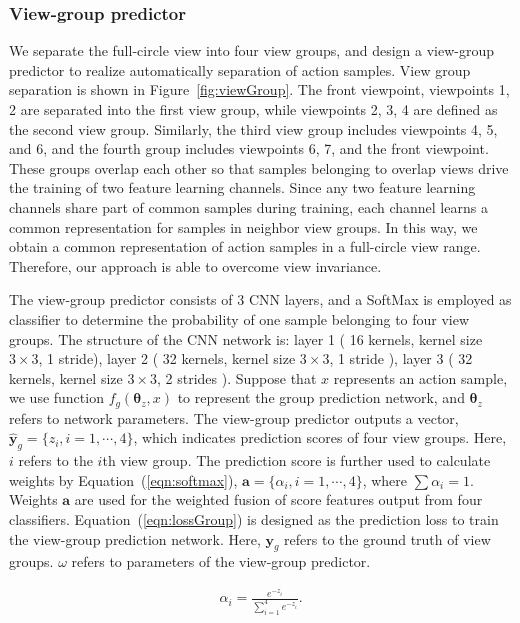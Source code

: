 \documentclass[journal]{IEEEtran}
\begin{document}
\subsubsection{View-group predictor}
We separate the full-circle view into four view groups, and design a view-group predictor to realize automatically separation of action samples.
View group separation is shown in Figure~\ref{fig:viewGroup}. The front viewpoint, viewpoints 1, 2 are separated into the first view group, while viewpoints 2, 3, 4 are defined as the second view group. Similarly, the third view group includes viewpoints 4, 5, and 6, and the fourth group includes viewpoints 6, 7, and the front viewpoint. These groups overlap each other so that samples belonging to overlap views drive the training of two feature learning channels. Since any two feature learning channels share part of common samples during training, each channel learns a common representation for samples in neighbor view groups. In this way, we obtain a common representation of action samples in a full-circle view range. Therefore, our approach is able to overcome view invariance.

The view-group predictor consists of 3 CNN layers, and a SoftMax is employed as classifier to determine the probability of one sample belonging to four view groups. The structure of the CNN network is: layer 1 ( 16 kernels, kernel size $3\times3$, 1 stride), layer 2 ( 32 kernels, kernel size $3\times3$, 1 stride ), layer 3 ( 32 kernels, kernel size $3 \times 3$, 2 strides ). Suppose that $x$ represents an action sample, we use function $f_g(\bm{\theta}_z, x)$ to represent the group prediction network, and $\bm{\theta}_z$ refers to network parameters. The view-group predictor outputs a vector, $\hat{\textbf{y}}_g = \{ z_i, i=1,\cdots, 4\}$, which indicates prediction scores of four view groups. Here, $i$ refers to the $i$th view group. The prediction score is further used to calculate weights by Equation~(\ref{eqn:softmax}), $\bm{a}= \{\alpha_i, i=1,\cdots, 4\}$, where $\sum{\alpha_i} =1$. Weights $\bm{a}$ are used for the weighted fusion of score features output from four classifiers. Equation~(\ref{eqn:lossGroup}) is designed as the prediction loss to train the view-group prediction network. Here, $\textbf{y}_g$ refers to the ground truth of view groups. $\omega$ refers to parameters of the view-group predictor.

\begin{equation}
\begin{aligned}
 \alpha_i = \frac{e^{-z_i}}{\sum\limits_{i=1}^4{e^{-z_i}}}.
\label{eqn:softmax}
\end{aligned}
\end{equation}
\end{document}

